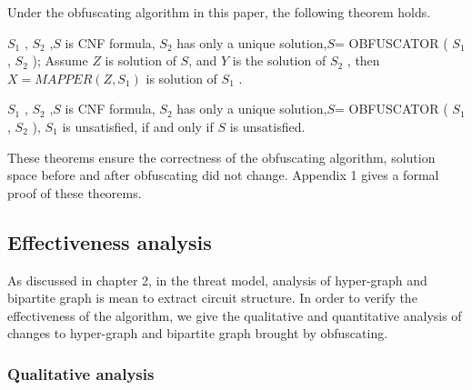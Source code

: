 \documentclass[runningheads,a4paper]{llncs}
\begin{document}
Under the obfuscating algorithm in this paper, the following theorem holds.


\begin{theorem}
$S_1$ , $S_2$ ,$S$ is CNF formula, $S_2$ has only a unique solution,$S$= OBFUSCATOR ( $S_1$ , $S_2$ ); 
 Assume $Z$ is solution of $S$, and $Y$ is the solution of $S_2$ , 
 then $X = MAPPER (Z, S_1)$ is solution of $S_1$ .
\end{theorem}

\begin{theorem}
$S_1$ , $S_2$ ,$S$ is CNF formula, $S_2$ has only a unique solution,$S$= OBFUSCATOR ( $S_1$ , $S_2$ ),
$S_1$  is unsatisfied, if and only if $S$ is unsatisfied.
\end{theorem}

These theorems ensure the correctness of the obfuscating algorithm, solution space before and after obfuscating did not change. Appendix 1 gives a formal proof of these theorems.
\subsection{Effectiveness analysis}

As discussed in chapter 2, in the threat model, analysis of hyper-graph and bipartite graph is mean to extract circuit structure. 
In order to verify the effectiveness of the algorithm, we give the qualitative and quantitative analysis of changes to hyper-graph and bipartite graph brought by obfuscating.
\subsubsection{Qualitative analysis}
\end{document}
